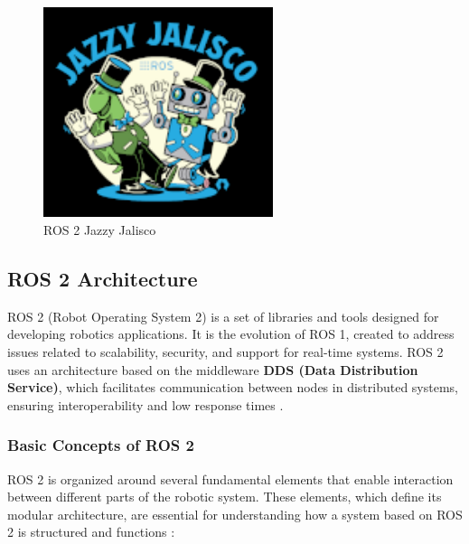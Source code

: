 \begin{figure}[h!]
    \centering
    \includegraphics[width=0.6\textwidth]{pictures/jazzy_logo.png}
    \caption{ROS 2 Jazzy Jalisco}
    \label{fig:imagen2}
\end{figure}

\subsection{ROS 2 Architecture}

    ROS 2 (Robot Operating System 2) is a set of libraries and tools designed for developing robotics applications. It is the evolution of ROS 1, created to address issues related to scalability, security, and support for real-time systems. ROS 2 uses an architecture based on the middleware \textbf{DDS (Data Distribution Service)}, which facilitates communication between nodes in distributed systems, ensuring interoperability and low response times \cite{ros_docs}.  
    
    \subsubsection{Basic Concepts of ROS 2}
    
    ROS 2 is organized around several fundamental elements that enable interaction between different parts of the robotic system. These elements, which define its modular architecture, are essential for understanding how a system based on ROS 2 is structured and functions \cite{ros_docs}:  
    
